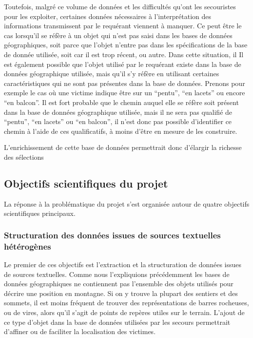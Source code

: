 Toutefois, malgré ce volume de données et les difficultés qu'ont les
secouristes pour les exploiter, certaines données nécessaires à
l'interprétation des informations transmissent par le requérant
viennent à manquer. Ce peut être le cas lorsqu'il se réfère à un objet
qui n'est pas saisi dans les bases de données géographiques, soit
parce que l'objet n'entre pas dans les spécifications de la base de
donnée utilisée, soit car il est trop récent, ou autre. Dans cette
situation, il
%
Il est également possible que l'objet utilisé par le requérant existe
dans la base de données géographique utilisée, mais qu'il s'y réfère
en utilisant certaines caractéristiques qui ne sont pas présentes dans
la base de données. Prenons pour exemple le cas où une victime indique
être sur un \enquote{pentu}, \enquote{en lacets} ou encore \enquote{en
  balcon}. Il est fort probable que le chemin auquel elle se réfère
soit présent dans la base de données géographique utilisée, mais il ne
sera pas qualifié de \enquote{pentu}, \enquote{en lacets} ou
\enquote{en balcon}, il n'est donc pas possible d'identifier ce chemin
à l'aide de ces qualificatifs, à moins d'être en mesure de les
construire.


L'enrichissement de cette base de données permettrait
donc d'élargir la richesse des sélections

\subsection{Objectifs scientifiques du projet}
\label{subsec:1-2-3}

La réponse à la problématique du projet s'est organisée autour de
quatre objectifs scientifiques principaux.

\subsubsection{Structuration des données issues de sources textuelles
  hétérogènes}
\label{subsec:1-2-3-1}

Le premier de ces objectifs est l'extraction et la structuration de
données issues de sources textuelles. Comme nous l’expliquions
précédemment les bases de données géographiques ne contiennent pas
l'ensemble des objets utilisés pour décrire une position en
montagne. Si on y trouve la plupart des sentiers et des sommets, il
est moins fréquent de trouver des représentations de barres rocheuses,
ou de vires, alors qu'il s'agit de points de repères utiles sur le
terrain. L'ajout de ce type d'objet dans la base de données utilisées
par les secours permettrait d’affiner ou de faciliter la localisation
des victimes.

